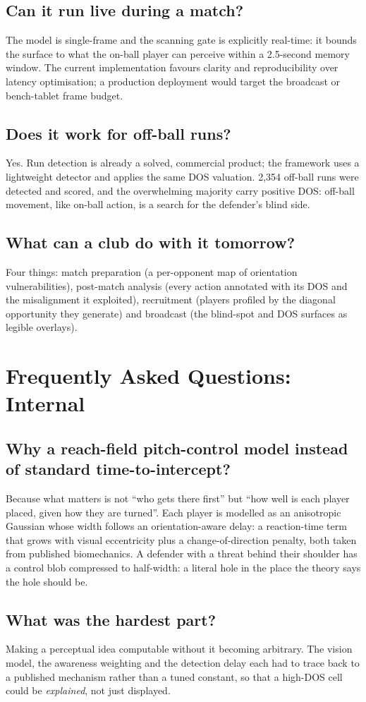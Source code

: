 \documentclass[11pt]{article}
\newcommand{\faq}[1]{\subsection{#1}}
\begin{document}
\faq{Can it run live during a match?}
The model is single-frame and the scanning gate is explicitly real-time:
it bounds the surface to what the on-ball player can perceive within a
2.5-second memory window. The current implementation favours clarity and
reproducibility over latency optimisation; a production deployment would
target the broadcast or bench-tablet frame budget.

\faq{Does it work for off-ball runs?}
Yes. Run detection is already a solved, commercial product; the framework
uses a lightweight detector and applies the same DOS valuation. 2{,}354
off-ball runs were detected and scored, and the overwhelming majority carry
positive DOS: off-ball movement, like on-ball action, is a search for the
defender's blind side.

\faq{What can a club do with it tomorrow?}
Four things: match preparation (a per-opponent map of orientation
vulnerabilities), post-match analysis (every action annotated with its DOS
and the misalignment it exploited), recruitment (players profiled by the
diagonal opportunity they generate) and broadcast (the blind-spot and DOS
surfaces as legible overlays).

\section{Frequently Asked Questions: Internal}

\faq{Why a reach-field pitch-control model instead of standard
time-to-intercept?}
Because what matters is not ``who gets there first'' but ``how well is each
player placed, given how they are turned''. Each player is modelled as an
anisotropic Gaussian whose width follows an orientation-aware delay: a
reaction-time term that grows with visual eccentricity plus a
change-of-direction penalty, both taken from published biomechanics. A
defender with a threat behind their shoulder has a control blob compressed
to half-width: a literal hole in the place the theory says the hole should
be.

\faq{What was the hardest part?}
Making a perceptual idea computable without it becoming arbitrary. The
vision model, the awareness weighting and the detection delay each had to
trace back to a published mechanism rather than a tuned constant, so that a
high-DOS cell could be \emph{explained}, not just displayed.
\end{document}
